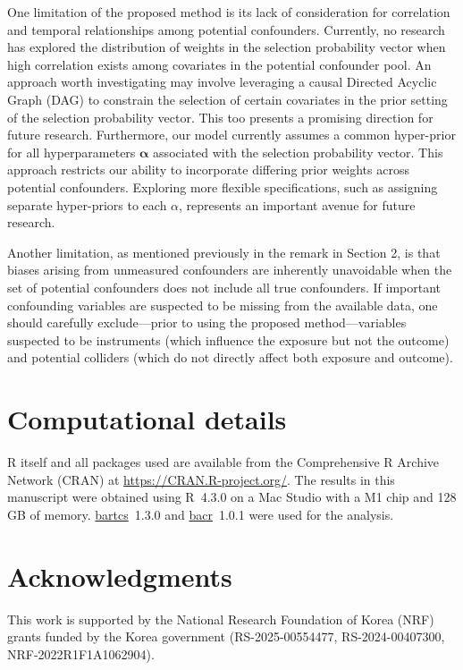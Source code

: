 One limitation of the proposed method is its lack of consideration for correlation and temporal relationships among potential confounders. Currently, no research has explored the distribution of weights in the selection probability vector when high correlation exists among covariates in the potential confounder pool. An approach worth investigating may involve leveraging a causal Directed Acyclic Graph (DAG) to constrain the selection of certain covariates in the prior setting of the selection probability vector. This too presents a promising direction for future research. Furthermore, our model currently assumes a common hyper-prior for all hyperparameters $\boldsymbol{\alpha}$ associated with the selection probability vector. This approach restricts our ability to incorporate differing prior weights across potential confounders. Exploring more flexible specifications, such as assigning separate hyper-priors to each $\alpha$, represents an important avenue for future research. 

Another limitation, as mentioned previously in the remark in Section 2, is that biases arising from unmeasured confounders are inherently unavoidable when the set of potential confounders does not include all true confounders. If important confounding variables are suspected to be missing from the available data, one should carefully exclude—prior to using the proposed method—variables suspected to be instruments (which influence the exposure but not the outcome) and potential colliders (which do not directly affect both exposure and outcome).



\section*{Computational details}

R itself and all packages used are available from the Comprehensive
R Archive Network (CRAN) at \url{https://CRAN.R-project.org/}. The results in this manuscript were obtained using R~4.3.0 on a Mac Studio with
a M1 chip and 128 GB of memory. \href{https://cran.r-project.org/package=bartcs}{bartcs}~1.3.0 and \href{https://cran.r-project.org/package=bacr}{bacr}~1.0.1 were used for the analysis.


\section*{Acknowledgments}
This work is supported by the National Research Foundation of Korea (NRF) grants funded by the Korea government (RS-2025-00554477, RS-2024-00407300, NRF-2022R1F1A1062904).



